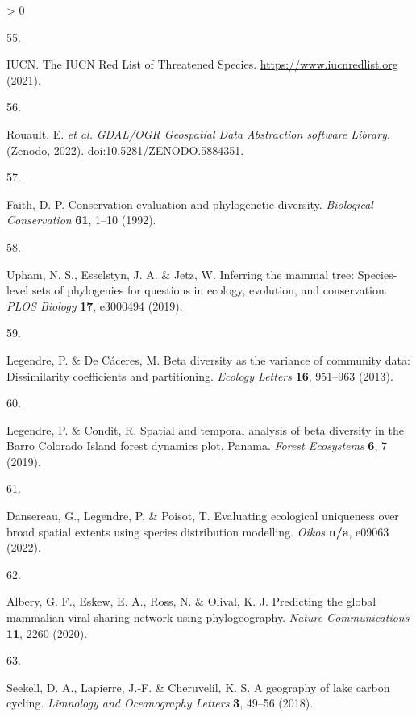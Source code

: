 \documentclass[11pt]{article}
\newlength{\cslhangindent}
\newlength{\csllabelwidth}
\newenvironment{CSLReferences}[3] %
 {%
  \setlength{\parindent}{0pt}
  \ifodd #1 \everypar{\setlength{\hangindent}{\cslhangindent}}\ignorespaces\fi
  \ifnum #2 > 0
  \setlength{\parskip}{#2\baselineskip}
  \fi
 }%
 {}
\newcommand{\CSLLeftMargin}[1]{\parbox[t]{\maxof{\widthof{#1}}{\csllabelwidth}}{#1}}
\newcommand{\CSLRightInline}[1]{\parbox[t]{\linewidth}{#1}}
\begin{document}
\begin{CSLReferences}{0}{0}
\leavevmode\hypertarget{ref-IUCN2021IucRed}{}%
\CSLLeftMargin{55. }
\CSLRightInline{IUCN. The IUCN Red List of Threatened Species.
\url{https://www.iucnredlist.org} (2021).}

\leavevmode\hypertarget{ref-RouaultEven2022GdaOgr}{}%
\CSLLeftMargin{56. }
\CSLRightInline{Rouault, E. \emph{et al.} \emph{GDAL/OGR Geospatial Data
Abstraction software Library}. (Zenodo, 2022).
doi:\href{https://doi.org/10.5281/ZENODO.5884351}{10.5281/ZENODO.5884351}.}

\leavevmode\hypertarget{ref-Faith1992ConEva}{}%
\CSLLeftMargin{57. }
\CSLRightInline{Faith, D. P. Conservation evaluation and phylogenetic
diversity. \emph{Biological Conservation} \textbf{61}, 1--10 (1992).}

\leavevmode\hypertarget{ref-Upham2019InfMam}{}%
\CSLLeftMargin{58. }
\CSLRightInline{Upham, N. S., Esselstyn, J. A. \& Jetz, W. Inferring the
mammal tree: Species-level sets of phylogenies for questions in ecology,
evolution, and conservation. \emph{PLOS Biology} \textbf{17}, e3000494
(2019).}

\leavevmode\hypertarget{ref-Legendre2013BetDiv}{}%
\CSLLeftMargin{59. }
\CSLRightInline{Legendre, P. \& De Cáceres, M. Beta diversity as the
variance of community data: Dissimilarity coefficients and partitioning.
\emph{Ecology Letters} \textbf{16}, 951--963 (2013).}

\leavevmode\hypertarget{ref-Legendre2019SpaTem}{}%
\CSLLeftMargin{60. }
\CSLRightInline{Legendre, P. \& Condit, R. Spatial and temporal analysis
of beta diversity in the Barro Colorado Island forest dynamics plot,
Panama. \emph{Forest Ecosystems} \textbf{6}, 7 (2019).}

\leavevmode\hypertarget{ref-Dansereau2022EvaEco}{}%
\CSLLeftMargin{61. }
\CSLRightInline{Dansereau, G., Legendre, P. \& Poisot, T. Evaluating
ecological uniqueness over broad spatial extents using species
distribution modelling. \emph{Oikos} \textbf{n/a}, e09063 (2022).}

\leavevmode\hypertarget{ref-Albery2020PreGlo}{}%
\CSLLeftMargin{62. }
\CSLRightInline{Albery, G. F., Eskew, E. A., Ross, N. \& Olival, K. J.
Predicting the global mammalian viral sharing network using
phylogeography. \emph{Nature Communications} \textbf{11}, 2260 (2020).}

\leavevmode\hypertarget{ref-Seekell2018GeoLak}{}%
\CSLLeftMargin{63. }
\CSLRightInline{Seekell, D. A., Lapierre, J.-F. \& Cheruvelil, K. S. A
geography of lake carbon cycling. \emph{Limnology and Oceanography
Letters} \textbf{3}, 49--56 (2018).}


\end{CSLReferences}
\end{document}

